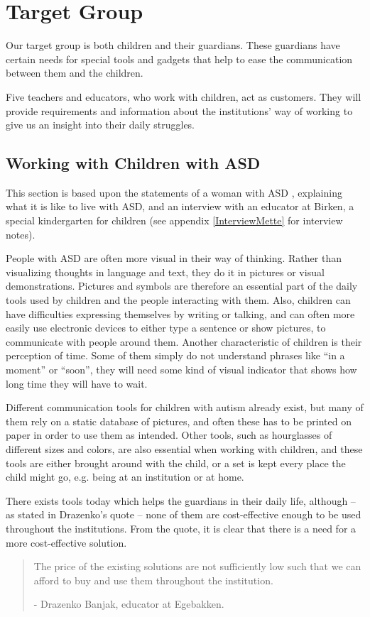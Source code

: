 \section{Target Group}
Our target group is both children and their guardians. These guardians have certain needs for special tools and gadgets that help to ease the communication between them and the children.

Five teachers and educators, who work with children, act as customers. They will provide requirements and information about the institutions' way of working to give us an insight into their daily struggles.

\subsection{Working with Children with ASD}
This section is based upon the statements of a woman with ASD \cite{autism.com}, explaining what it is like to live with ASD, and an interview with an educator at Birken, a special kindergarten for children (see appendix \ref{InterviewMette} for interview notes).

	People with ASD are often more visual in their way of thinking. Rather than visualizing thoughts in language and text, they do it in pictures or visual demonstrations. Pictures and symbols are therefore an essential part of the daily tools used by children and the people interacting with them. Also, children can have difficulties expressing themselves by writing or talking, and can often more easily use electronic devices to either type a sentence or show pictures, to communicate with people around them.
	Another characteristic of children is their perception of time. Some of them simply do not understand phrases like ``in a moment'' or ``soon'', they will need some kind of visual indicator that shows how long time they will have to wait.

Different communication tools for children with autism already exist, but many of them rely on a static database of pictures, and often these has to be printed on paper in order to use them as intended. Other tools, such as hourglasses of different sizes and colors, are also essential when working with children, and these tools are either brought around with the child, or a set is kept every place the child might go, e.g. being at an institution or at home.

There exists tools today which helps the guardians in their daily life, although -- as stated in Drazenko's quote -- none of them are cost-effective enough to be used throughout the institutions. From the quote, it is clear that there is a need for a more cost-effective solution.
\newpage
\begin{quotation}
The price of the existing solutions are not sufficiently low such that we can afford to buy and use them throughout the institution.\\ 
	\begin{flushright}
		- Drazenko Banjak, educator at Egebakken.
	\end{flushright}
\end{quotation}